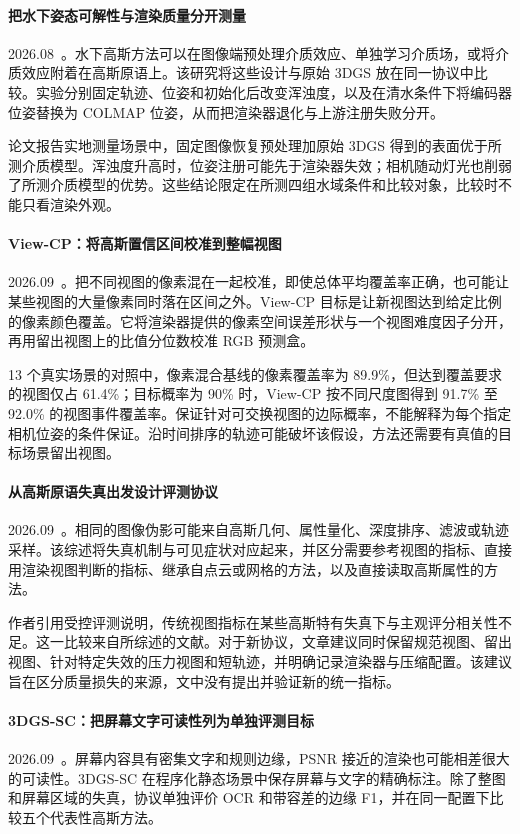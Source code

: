 \paragraph{把水下姿态可解性与渲染质量分开测量}
2026.08~\cite{2608_25483}。水下高斯方法可以在图像端预处理介质效应、单独学习介质场，或将介质效应附着在高斯原语上。该研究将这些设计与原始 3DGS 放在同一协议中比较。实验分别固定轨迹、位姿和初始化后改变浑浊度，以及在清水条件下将编码器位姿替换为 COLMAP 位姿，从而把渲染器退化与上游注册失败分开。

论文报告实地测量场景中，固定图像恢复预处理加原始 3DGS 得到的表面优于所测介质模型。浑浊度升高时，位姿注册可能先于渲染器失效；相机随动灯光也削弱了所测介质模型的优势。这些结论限定在所测四组水域条件和比较对象，比较时不能只看渲染外观。

\paragraph{View-CP：将高斯置信区间校准到整幅视图}
2026.09~\cite{2609_10307}。把不同视图的像素混在一起校准，即使总体平均覆盖率正确，也可能让某些视图的大量像素同时落在区间之外。View-CP 目标是让新视图达到给定比例的像素颜色覆盖。它将渲染器提供的像素空间误差形状与一个视图难度因子分开，再用留出视图上的比值分位数校准 RGB 预测盒。

13 个真实场景的对照中，像素混合基线的像素覆盖率为 89.9\%，但达到覆盖要求的视图仅占 61.4\%；目标概率为 90\% 时，View-CP 按不同尺度图得到 91.7\% 至 92.0\% 的视图事件覆盖率。保证针对可交换视图的边际概率，不能解释为每个指定相机位姿的条件保证。沿时间排序的轨迹可能破坏该假设，方法还需要有真值的目标场景留出视图。

\paragraph{从高斯原语失真出发设计评测协议}
2026.09~\cite{2609_23027}。相同的图像伪影可能来自高斯几何、属性量化、深度排序、滤波或轨迹采样。该综述将失真机制与可见症状对应起来，并区分需要参考视图的指标、直接用渲染视图判断的指标、继承自点云或网格的方法，以及直接读取高斯属性的方法。

作者引用受控评测说明，传统视图指标在某些高斯特有失真下与主观评分相关性不足。这一比较来自所综述的文献。对于新协议，文章建议同时保留规范视图、留出视图、针对特定失效的压力视图和短轨迹，并明确记录渲染器与压缩配置。该建议旨在区分质量损失的来源，文中没有提出并验证新的统一指标。

\paragraph{3DGS-SC：把屏幕文字可读性列为单独评测目标}
2026.09~\cite{2609_31756}。屏幕内容具有密集文字和规则边缘，PSNR 接近的渲染也可能相差很大的可读性。3DGS-SC 在程序化静态场景中保存屏幕与文字的精确标注。除了整图和屏幕区域的失真，协议单独评价 OCR 和带容差的边缘 F1，并在同一配置下比较五个代表性高斯方法。


